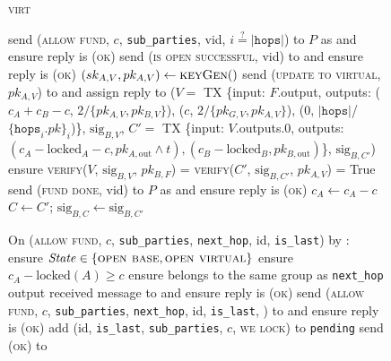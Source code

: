\begin{figure}[H]
\begin{processbox}{\textsc{virt}}
\begin{algorithmic}[1]
        \label{code:functionality:chan:skeleton:virtual:fund:init}
         
        \label{code:functionality:chan:skeleton:virtual:fund:for:allow:start}
          \State send (\textsc{allow fund}, $c$, \texttt{sub\_parties}, vid, $i
          \overset{?}{=} |\mathtt{hops}|$) to $P$ as \alice and ensure reply
          is (\textsc{ok})
          \label{code:functionality:chan:skeleton:virtual:fund:for:allow:send}
        \EndFor
        \label{code:functionality:chan:skeleton:virtual:fund:for:allow:end}
          \State send (\textsc{is open successful}, vid) to \adversary and ensure
          reply is (\textsc{ok})
          \State $(sk_{A, V}, pk_{A, V}) \gets \textsc{keyGen}()$
          \State send (\textsc{update to virtual}, $pk_{A, V}$) to \adversary
          and assign reply to ($V =$ TX \{input: $F$.output, outputs: ($c_A +
          c_B - c$, $2/\{pk_{A, V}, pk_{B, V}\}$), ($c$, $2/\{pk_{G, V}, pk_{A,
          V}\}$), (0, $|\mathtt{hops}|$/$\{\mathtt{hops}_i.pk\}_i$)\},
          $\mathrm{sig}_{B, V}$, $C' =$ TX \{input: $V$.outputs.0, outputs:
          $(c_A - \mathrm{locked}_A - c, pk_{A, \mathrm{out}} \wedge t), (c_B -
          \mathrm{locked}_B, pk_{B, \mathrm{out}})$\}, $\mathrm{sig}_{B, C'}$)
          \State ensure \textsc{verify}($V$, $\mathrm{sig}_{B, V}$, $pk_{B,
          F}$) = \textsc{verify}($C'$, $\mathrm{sig}_{B, C'}$, $pk_{A, V}$) =
          True
        \EndIf
        \label{code:functionality:chan:skeleton:virtual:fund:simulate}
         
        \label{code:functionality:chan:skeleton:virtual:fund:confirm}
          \State send (\textsc{fund done}, vid) to $P$ as \alice and ensure reply
          is (\textsc{ok})
        \EndFor
        \State $c_A \gets c_A - c$
          \State $C \gets C'$; $\mathrm{sig}_{B, C} \gets \mathrm{sig}_{B, C'}$
        \EndIf

      \State {}
      \State On (\textsc{allow fund}, $c$, \texttt{sub\_parties},
      \texttt{next\_hop}, id, \texttt{is\_last}) by \charlie:
      \Indent
        \State ensure $\mathit{State} \in \{\textsc{open base}, \textsc{open
        virtual}\}$
        \State ensure $c_A - \mathrm{locked}(A) \geq c$
        \State ensure \bob belongs to the same group as \texttt{next\_hop}
        \State output received message to \dave and ensure reply is
        \textsc{(ok)}
        \State send (\textsc{allow fund}, $c$, \texttt{sub\_parties},
        \texttt{next\_hop}, id, \texttt{is\_last}, \charlie) to \bob and ensure
        reply is (\textsc{ok})
        \State add (id, \texttt{is\_last}, \texttt{sub\_parties}, $c$,
        \textsc{we lock}) to \texttt{pending}
        \State send (\textsc{ok}) to \charlie
      \EndIndent
      \Statex


\end{algorithmic}
\end{processbox}
\end{figure}

